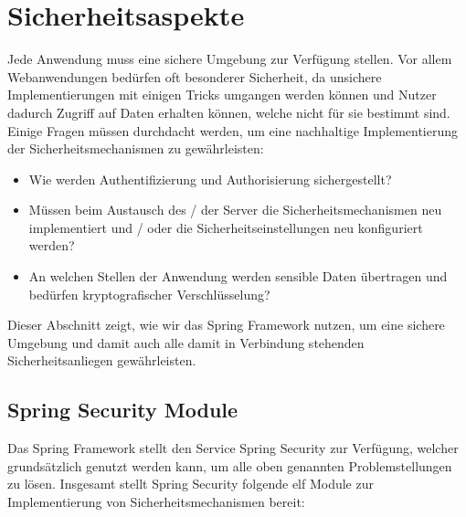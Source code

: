 \section{Sicherheitsaspekte}
\label{sec:security}
Jede Anwendung muss eine sichere Umgebung zur Verfügung stellen. Vor allem 
Webanwendungen bedürfen oft besonderer Sicherheit, da unsichere
Implementierungen mit einigen Tricks umgangen werden können und Nutzer dadurch 
Zugriff auf Daten erhalten können, welche nicht für sie bestimmt sind. Einige 
Fragen müssen durchdacht werden, um eine nachhaltige Implementierung der 
Sicherheitsmechanismen zu gewährleisten:

\begin{itemize}
\item Wie werden Authentifizierung und Authorisierung sichergestellt?
\item Müssen beim Austausch des / der Server die Sicherheitsmechanismen neu implementiert und / oder die
	  Sicherheitseinstellungen neu konfiguriert werden?
\item An welchen Stellen der Anwendung werden sensible Daten übertragen und bedürfen kryptografischer 	      
      Verschlüsselung?
\end{itemize} 

Dieser Abschnitt zeigt, wie wir das Spring Framework nutzen, um eine sichere 
Umgebung und damit auch alle damit in Verbindung stehenden Sicherheitsanliegen 
gewährleisten.

\subsection{Spring Security Module}
\label{subsec:spring_security}

Das Spring Framework stellt den Service Spring Security zur Verfügung, welcher grundsätzlich genutzt 
werden kann, um alle oben genannten Problemstellungen zu lösen. Insgesamt stellt Spring Security folgende 
elf Module zur Implementierung von Sicherheitsmechanismen bereit:

